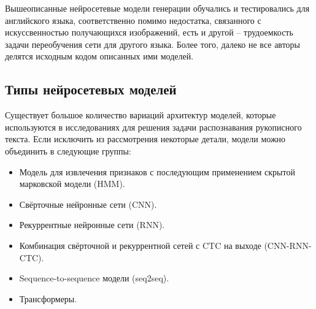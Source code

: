 Вышеописанные нейросетевые модели генерации обучались и тестировались для английского языка, соответственно помимо недостатка,
связанного с искуссвенностью получающихся изображений, есть и другой -- трудоемкость задачи переобучения сети для другого языка.
Более того, далеко не все авторы делятся исходным кодом описанных ими моделей.

\subsection{Типы нейросетевых моделей}
\label{subsec:networks-description}

Существует большое количество вариаций архитектур моделей, которые используются в исследованиях для решения задачи распознавания рукописного текста.
Если исключить из рассмотрения некоторые детали, модели можно объединить в следующие группы:
\begin{itemize}
    \item Модель для извлечения признаков с последующим применением скрытой марковской модели (HMM).
    \item Свёрточные нейронные сети (CNN).
    \item Рекуррентные нейронные сети (RNN).
    \item Комбинация свёрточной и рекуррентной сетей с CTC на выходе (CNN-RNN-CTC).
    \item Sequence-to-sequence модели (seq2seq).
    \item Трансформеры.
\end{itemize}

